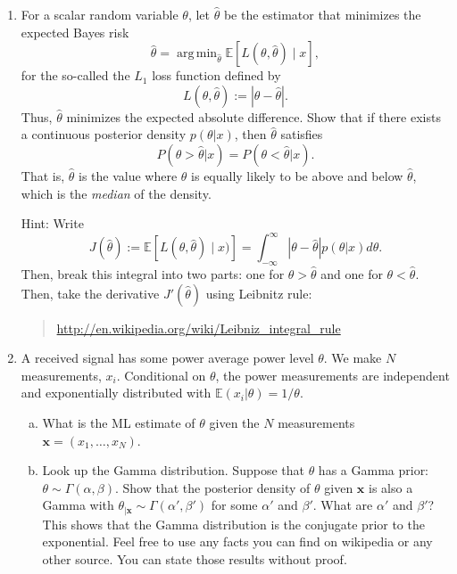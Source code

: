 \documentclass[11pt]{article}
\def\argmin{\mathop{\mathrm{arg\,min}}}
\def\Exp{\mathbb{E}}
\newcommand{\xbf}{\mathbf{x}}
\def\thetahat{{\widehat{\theta}}}
\begin{document}
\begin{enumerate}
\begin{enumerate}[(a)]
\item Use MATLAB to create a plot with the ML, MAP and MMSE estimate
$\thetahat$ for $x \in [-2,3]$ for $\lambda=1$ and $\sigma^2=0.1$.
Plot all three estimators in the same figure and use the 
command to identify the estimators.

\end{enumerate}

\item For a scalar
random variable $\theta$, let $\thetahat$ be the estimator that
minimizes the expected Bayes risk
\[
    \thetahat = \argmin_{\thetahat} \Exp\left[ L(\theta,\thetahat) \mid x \right],
\]
 for the so-called the $L_1$ loss function defined by
\[
    L(\theta,\thetahat) := |\theta-\thetahat|.
\]
Thus, $\thetahat$ minimizes the expected absolute difference.  Show that if
there exists a continuous posterior density $p(\theta|x)$, then $\thetahat$ satisfies
\[
    P(\theta > \thetahat|x) = P(\theta < \thetahat|x).
\]
That is, $\thetahat$ is the value where $\theta$ is equally likely to be above and below
$\thetahat$, which is the \emph{median} of the density.

Hint:  Write
\[
    J(\thetahat) := \Exp\left[ L(\theta,\thetahat) \mid x) \right] =
        \int_{-\infty}^\infty |\theta-\thetahat|p(\theta|x)d\theta.
\]
Then, break this integral into two parts:  one for $\theta > \thetahat$ and one for
$\theta < \thetahat$.  Then, take the derivative $J'(\thetahat)$ using Leibnitz rule:
\begin{quote}
    \url{http://en.wikipedia.org/wiki/Leibniz_integral_rule}
\end{quote}


\item A received signal has some power average power level $\theta$.  We make
$N$ measurements, $x_i$. Conditional on $\theta$, the power measurements are independent
and exponentially distributed with $\Exp(x_i|\theta) = 1/\theta$.
\begin{enumerate}[(a)]
\item What is the ML estimate of $\theta$ given the $N$ measurements $\xbf=(x_1,\ldots,x_N)$.

\item Look up the Gamma distribution.  Suppose that $\theta$ has a Gamma prior:
$\theta \sim \Gamma(\alpha,\beta)$.  Show that the posterior density of $\theta$ given $\xbf$
is also a Gamma with $\theta_{|\xbf} \sim \Gamma(\alpha',\beta')$ for some $\alpha'$ and $\beta'$.  What are $\alpha'$ and $\beta'$?  This shows that the Gamma distribution
 is the conjugate prior to the exponential.  Feel free to use any facts you can find on
wikipedia or any other source.  You can state those results without proof.


\end{enumerate}
\end{enumerate}
\end{document}
